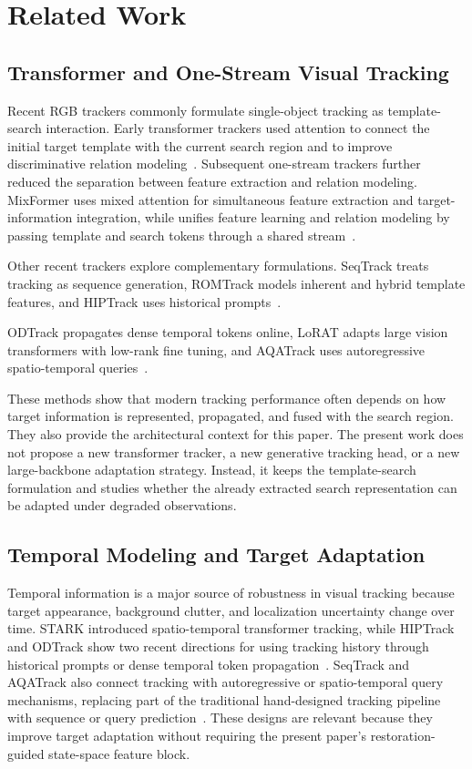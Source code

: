 \section{Related Work}

\subsection{Transformer and One-Stream Visual Tracking}
Recent RGB trackers commonly formulate single-object tracking as template-search interaction. Early transformer trackers used attention to connect the initial target template with the current search region and to improve discriminative relation modeling~\cite{chen2021transt,yan2021stark}. Subsequent one-stream trackers further reduced the separation between feature extraction and relation modeling. MixFormer uses mixed attention for simultaneous feature extraction and target-information integration, while \baseline{} unifies feature learning and relation modeling by passing template and search tokens through a shared stream~\cite{cui2022mixformer,ye2022ostrack}.

Other recent trackers explore complementary formulations. SeqTrack treats tracking as sequence generation, ROMTrack models inherent and hybrid template features, and HIPTrack uses historical prompts~\cite{chen2023seqtrack,cai2023romtrack,cai2024hiptrack}.

ODTrack propagates dense temporal tokens online, LoRAT adapts large vision transformers with low-rank fine tuning, and AQATrack uses autoregressive spatio-temporal queries~\cite{zheng2024odtrack,lin2024lorat,xie2024aqatrack}.

These methods show that modern tracking performance often depends on how target information is represented, propagated, and fused with the search region. They also provide the architectural context for this paper. The present work does not propose a new transformer tracker, a new generative tracking head, or a new large-backbone adaptation strategy. Instead, it keeps the \baseline{} template-search formulation and studies whether the already extracted search representation can be adapted under degraded observations.

\subsection{Temporal Modeling and Target Adaptation}
Temporal information is a major source of robustness in visual tracking because target appearance, background clutter, and localization uncertainty change over time. STARK introduced spatio-temporal transformer tracking, while HIPTrack and ODTrack show two recent directions for using tracking history through historical prompts or dense temporal token propagation~\cite{yan2021stark,cai2024hiptrack,zheng2024odtrack}. SeqTrack and AQATrack also connect tracking with autoregressive or spatio-temporal query mechanisms, replacing part of the traditional hand-designed tracking pipeline with sequence or query prediction~\cite{chen2023seqtrack,xie2024aqatrack}. These designs are relevant because they improve target adaptation without requiring the present paper's restoration-guided state-space feature block.

